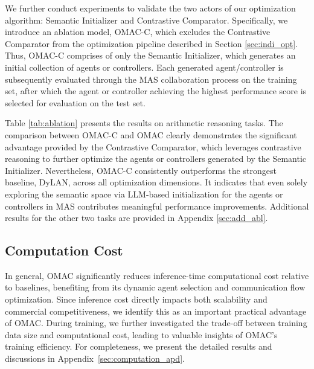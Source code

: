 We further conduct experiments to validate the two actors of our optimization algorithm: Semantic Initializer and Contrastive Comparator. Specifically, we introduce an ablation model, OMAC-C, which excludes the Contrastive Comparator from the optimization pipeline described in Section \ref{sec:indi_opt}. Thus, OMAC-C comprises of only the Semantic Initializer, which generates an initial collection of agents or controllers. Each generated agent/controller is subsequently evaluated through the MAS collaboration process on the training set, after which the agent or controller achieving the highest performance score is selected for evaluation on the test set.



Table \ref{tab:ablation} presents the results on arithmetic reasoning tasks. The comparison between OMAC-C and OMAC clearly demonstrates the significant advantage provided by the Contrastive Comparator, which leverages contrastive reasoning to further optimize the agents or controllers generated by the Semantic Initializer. Nevertheless, OMAC-C consistently outperforms the strongest baseline, DyLAN, across all optimization dimensions. It indicates that even solely exploring the semantic space via LLM-based initialization for the agents or controllers in MAS contributes meaningful performance improvements. Additional results for the other two tasks are provided in Appendix \ref{sec:add_abl}.



\subsection{Computation Cost}\label{sec:computation}

In general, OMAC significantly reduces inference-time computational cost relative to baselines, benefiting from its dynamic agent selection and communication flow optimization. Since inference cost directly impacts both scalability and commercial competitiveness, we identify this as an important practical advantage of OMAC.
During training, we further investigated the trade-off between training data size and computational cost, leading to valuable insights of OMAC's training efficiency. For completeness, we present the detailed results and discussions in Appendix~\ref{sec:computation_apd}.

